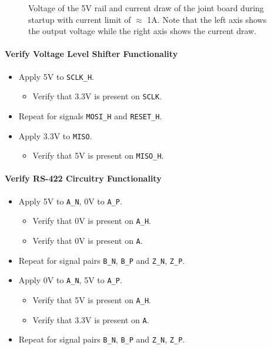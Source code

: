 \begin{figure}[h]
	\centering
	\caption[Voltages and current of 5V converter without current limit.]{Voltage of the 5V rail and current draw of the joint board during startup with current limit of $\approx$ 1A. Note that the left axis shows the output voltage while the right axis shows the current draw.}
	\label{fig:joint_no_curr_limit}
\end{figure}

\paragraph{Verify Voltage Level Shifter Functionality} %
\label{par:verify_voltage_level_shifter_functionality}
\begin{itemize}
	\item Apply 5V to \texttt{SCLK\_H}.
	\begin{itemize}
		\item[\cmark]  Verify that 3.3V is present on \texttt{SCLK}.
	\end{itemize}
	\item Repeat for signals \texttt{MOSI\_H} and \texttt{RESET\_H}.
	\item Apply 3.3V to \texttt{MISO}.
	\begin{itemize}
		\item[\cmark]  Verify that 5V is present on \texttt{MISO\_H}.
	\end{itemize}
\end{itemize}

\paragraph{Verify RS-422 Circuitry Functionality} %
\label{par:verify_rs_422_circuitry_functionality}
\begin{itemize}
	\item Apply 5V to \texttt{A\_N}, 0V to \texttt{A\_P}.
	\begin{itemize}
		\item[\cmark] Verify that 0V is present on \texttt{A\_H}.
		\item[\cmark] Verify that 0V is present on \texttt{A}.
	\end{itemize}
	\item Repeat for signal pairs \texttt{B\_N}, \texttt{B\_P} and \texttt{Z\_N}, \texttt{Z\_P}.
	\item Apply 0V to \texttt{A\_N}, 5V to \texttt{A\_P}.
	\begin{itemize}
		\item[\cmark] Verify that 5V is present on \texttt{A\_H}.
		\item[\cmark] Verify that 3.3V is present on \texttt{A}.
	\end{itemize}
	\item Repeat for signal pairs \texttt{B\_N}, \texttt{B\_P} and \texttt{Z\_N}, \texttt{Z\_P}.
\end{itemize}
